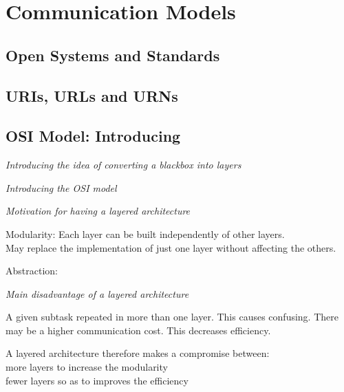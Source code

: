 
\chapter{Communication Models}



\section{Open Systems and Standards}




\section{URIs, URLs and URNs}



\section{OSI Model: Introducing}


\frmrule 

\textit{Introducing the idea of converting a blackbox into layers}

\frmrule 

\textit{Introducing the OSI model}




\frmrule 

\textit{Motivation for having a layered architecture}

Modularity:
Each layer can be built independently of other layers.\\
May replace the implementation of just one layer without affecting 
the others. 

Abstraction: 


\frmrule 

\textit{Main disadvantage of a layered architecture}

A given subtask repeated in more than one layer. 
This causes confusing. There may be a higher communication 
cost. This decreases efficiency. 

A layered architecture therefore makes a compromise between:\\
more layers to increase the modularity\\
fewer layers so as to improves the efficiency\\


\frmrule 

